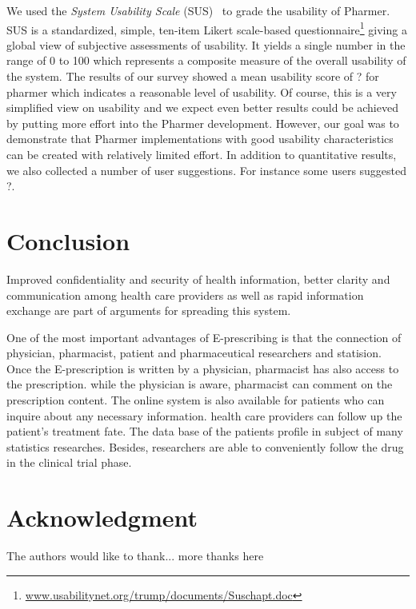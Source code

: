 \documentclass[10pt, conference, compsocconf]{IEEEtran}
\begin{document}
We used the \emph{System Usability Scale} (SUS)~\cite{SUS2009} to grade the usability of Pharmer.
SUS is a standardized, simple, ten-item Likert scale-based questionnaire\footnote{\url{www.usabilitynet.org/trump/documents/Suschapt.doc}} giving a global view of subjective assessments of usability.
It yields a single number in the range of 0 to 100 which represents a composite measure of the overall usability of the system.
The results of our survey showed a mean usability score of ? for pharmer which indicates a reasonable level of usability.
Of course, this is a very simplified view on usability and we expect even better results could be achieved by putting more effort into the Pharmer development.
However, our goal was to demonstrate that Pharmer implementations with good usability characteristics can be created with relatively limited effort.
In addition to quantitative results, we also collected a number of user suggestions.
For instance some users suggested ?.


\section{Conclusion}
Improved confidentiality and security of health information, better clarity and communication among health care providers as well as rapid information exchange are part of arguments for spreading this system.

One of the most important advantages of E-prescribing is that the connection of physician, pharmacist, patient and pharmaceutical researchers and statision.
Once the E-prescription is written by a physician, pharmacist has also access to the prescription.
while the physician is aware, pharmacist can comment on the prescription content.
The online system is also available for patients who can inquire about any necessary information.
health care providers can follow up the patient's treatment fate.
The data base of the patients profile in subject of many statistics researches.
Besides, researchers are able to conveniently follow the drug in the clinical trial phase.



\section*{Acknowledgment}


The authors would like to thank...
more thanks here








\end{document}
